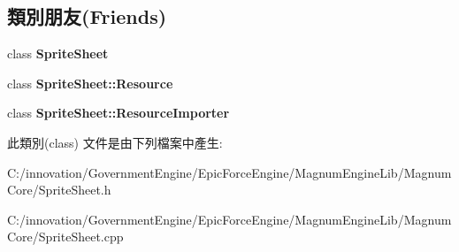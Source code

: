 \subsection*{類別朋友(Friends)}
\begin{DoxyCompactItemize}
\item 
class {\bfseries Sprite\+Sheet}\hypertarget{class_i_dream_sky_1_1_sprite_sheet_1_1_data_ab43118917ba092ba6289c7ee4cd3e5fd}{}\label{class_i_dream_sky_1_1_sprite_sheet_1_1_data_ab43118917ba092ba6289c7ee4cd3e5fd}

\item 
class {\bfseries Sprite\+Sheet\+::\+Resource}\hypertarget{class_i_dream_sky_1_1_sprite_sheet_1_1_data_a8727041c910f9527ea7b20dfac74f485}{}\label{class_i_dream_sky_1_1_sprite_sheet_1_1_data_a8727041c910f9527ea7b20dfac74f485}

\item 
class {\bfseries Sprite\+Sheet\+::\+Resource\+Importer}\hypertarget{class_i_dream_sky_1_1_sprite_sheet_1_1_data_a3c6baee866d2819736b4c0a94c9e507c}{}\label{class_i_dream_sky_1_1_sprite_sheet_1_1_data_a3c6baee866d2819736b4c0a94c9e507c}

\end{DoxyCompactItemize}


此類別(class) 文件是由下列檔案中產生\+:\begin{DoxyCompactItemize}
\item 
C\+:/innovation/\+Government\+Engine/\+Epic\+Force\+Engine/\+Magnum\+Engine\+Lib/\+Magnum\+Core/Sprite\+Sheet.\+h\item 
C\+:/innovation/\+Government\+Engine/\+Epic\+Force\+Engine/\+Magnum\+Engine\+Lib/\+Magnum\+Core/Sprite\+Sheet.\+cpp\end{DoxyCompactItemize}
